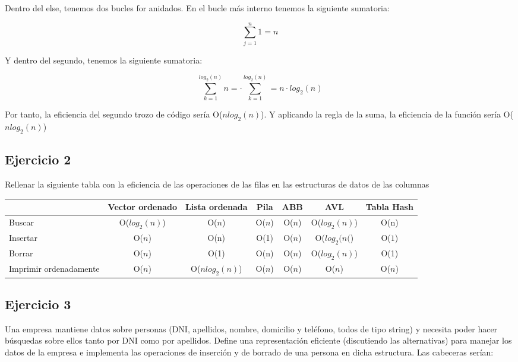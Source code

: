 \documentclass[10pt,a4paper,spanish]{report}
\begin{document}
\noindent
Dentro del else, tenemos dos bucles for anidados. En el bucle más interno tenemos la siguiente sumatoria:

\begin{displaymath}
\sum_{j=1}^n 1 = n
\end{displaymath}

\noindent
Y dentro del segundo, tenemos la siguiente sumatoria:

\begin{displaymath}
\sum_{k=1}^{log_2 (n)} n = \cdot \sum_{k=1}^{log_2 (n)} = n \cdot log_2 (n)
\end{displaymath}

\noindent
Por tanto, la eficiencia del segundo trozo de código sería O($n log_2(n)$). Y aplicando la regla de la suma, la eficiencia de la función sería O($n log_2 (n)$)

\subsection{\textcolor[rgb]{0.5,0.8,1}Ejercicio 2}
\noindent
Rellenar la siguiente tabla con la eficiencia de las operaciones de las filas en las estructuras de datos de las columnas

\begin{tabular}{p{1.5cm}|c|c|c|c|c|c}
& Vector ordenado & Lista ordenada & Pila & ABB & AVL & Tabla Hash \\
\hline
Buscar & O($log_2(n)$) & O($n$) & O($n$) & O($n$) & O($log_2 (n)$) & O(n) \\
Insertar & O($n$) & O(n) & O(1) & O($n$) & O($log_2(n($) & O($1$) \\
Borrar & O($n$) & O(1) & O(n) & O($n$) & O($log_2(n)$) & O(1) \\
Imprimir ordenadamente & O($n$) & O($nlog_2(n)$) & O($n$) & O($n$) & O($n$) &O($n$) \\
\end{tabular}

\subsection{\textcolor[rgb]{0.5,0.8,1}Ejercicio 3}
\noindent
Una empresa mantiene datos sobre personas (DNI, apellidos, nombre, domicilio y teléfono, todos de tipo string) y necesita poder hacer búsquedas sobre ellos tanto por DNI como por apellidos. Define una representación eficiente (discutiendo las alternativas) para manejar los datos de la empresa e implementa las operaciones de inserción y de borrado de una persona en dicha estructura. Las cabeceras serían:
\end{document}
